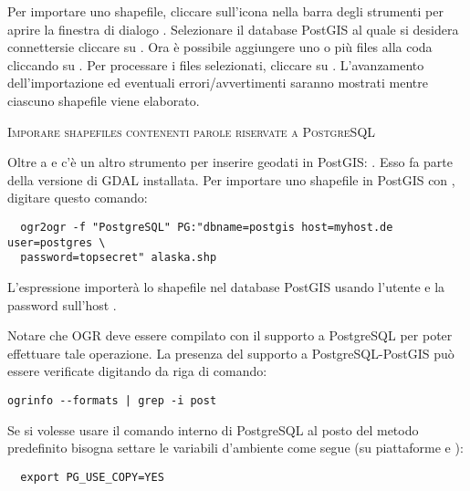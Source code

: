 Per importare uno shapefile, cliccare sull'icona  nella barra degli strumenti per aprire la finestra di
dialogo .
Selezionare il database PostGIS al quale si desidera connettersie cliccare su
. Ora è possibile aggiungere uno o più files alla coda
cliccando su . Per processare i files selezionati, cliccare
su . L'avanzamento dell'importazione ed eventuali
errori/avvertimenti saranno mostrati mentre ciascuno shapefile viene
elaborato.
\begin{Tip}\caption{\textsc{Imporare shapefiles contenenti parole riservate a PostgreSQL}}
\end{Tip} 

Oltre a  e  c'è un altro strumento per
inserire geodati in PostGIS: . Esso fa parte della versione
di GDAL installata.
Per importare uno shapefile in PostGIS con , digitare questo
comando:
\begin{verbatim}
  ogr2ogr -f "PostgreSQL" PG:"dbname=postgis host=myhost.de user=postgres \
  password=topsecret" alaska.shp
\end{verbatim}

L'espressione importerà lo shapefile  nel database PostGIS
\usertext{postgis}
usando l'utente  e la password  sull'host
\server{myhost.de}.

Notare che OGR deve essere compilato con il supporto a PostgreSQL per poter
effettuare tale operazione.
La presenza del supporto a PostgreSQL-PostGIS può essere verificate digitando
da riga di comando:
\begin{verbatim}
ogrinfo --formats | grep -i post
\end{verbatim}

Se si volesse usare il comando interno di PostgreSQL  al posto
del metodo predefinito \filename{INSERT INTO} bisogna settare le variabili
d'ambiente come segue (su piattaforme \nix e \osx):
\begin{verbatim}
  export PG_USE_COPY=YES
\end{verbatim}

